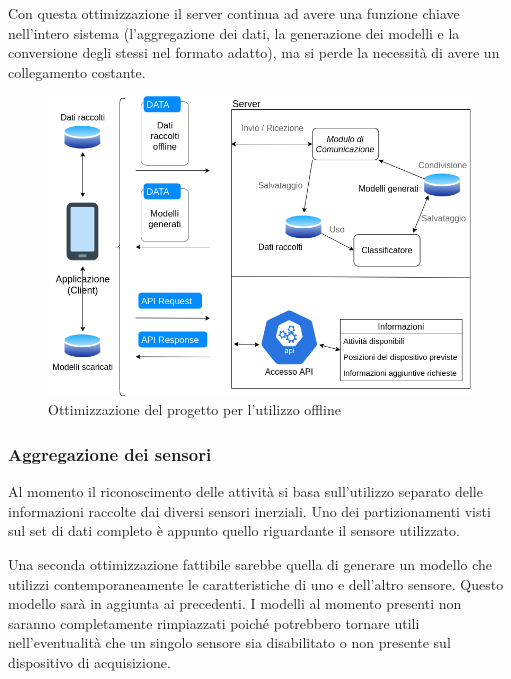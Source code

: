 \vspace{5mm} %
Con questa ottimizzazione il server continua ad avere una funzione chiave nell'intero sistema (l'aggregazione dei dati, la 
generazione dei modelli e la conversione degli stessi nel formato adatto), ma si perde la necessità di avere un collegamento costante.

\begin{figure}[H]
    \centering
    \includegraphics[scale = 0.56]{assets/images/future/offline.png}
    \caption{Ottimizzazione del progetto per l'utilizzo offline}
    \label{fig:future_overview}
\end{figure}

\subsubsection{Aggregazione dei sensori}
Al momento il riconoscimento delle attività si basa sull'utilizzo separato delle informazioni raccolte dai diversi sensori inerziali.
Uno dei partizionamenti visti sul set di dati completo è appunto quello riguardante il sensore utilizzato.

\vspace{5mm} %

Una seconda ottimizzazione fattibile sarebbe quella di generare un modello che utilizzi contemporaneamente le caratteristiche di uno e dell'altro sensore.
Questo modello sarà in aggiunta ai precedenti. I modelli al momento presenti non saranno completamente rimpiazzati poiché potrebbero 
tornare utili nell'eventualità che un singolo sensore sia disabilitato o non presente sul dispositivo di acquisizione.

